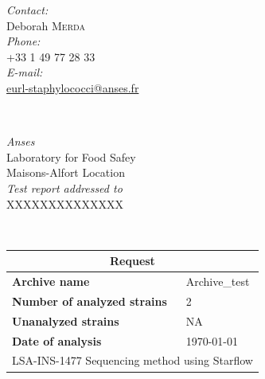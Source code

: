 \documentclass[a4paper]{article}
\begin{document}
\begin{titlepage}

\begin{minipage}{0.4\textwidth}
\begin{flushleft} \large
\emph{Contact:}\\
Deborah \textsc{Merda} \\ 
\emph{Phone:}\\
+33 1 49 77 28 33\\
\emph{E-mail:}\\
\href{mailto:eurl-staphylococci@anses.fr}{eurl-staphylococci@anses.fr}
\end{flushleft}
\end{minipage}
~
\begin{minipage}{0.5\textwidth}
\begin{flushright} \large
\emph{Anses} \\
Laboratory for Food Safey \\
Maisons-Alfort Location\\
[0.5cm] \emph{Test report addressed to } \\
XXXXXXXXXXXXXX\\ %
\end{flushright}
\end{minipage}\\[3cm]

{\renewcommand{\arraystretch}{2} %
{\setlength{\tabcolsep}{1.5cm} %
\begin{tabular}{|l|l|}
  \hline
  \multicolumn{2}{|c|}{\textbf{\Large{Request}}} \\
  \hline
  \textbf{\Large{Archive name}} & \Large{Archive\_test} \\%
  \textbf{\Large{Number of analyzed strains}} & \Large{2} \\%
  \textbf{\Large{Unanalyzed strains}} & \Large{NA} \\%
  \textbf{\Large{Date of analysis}} & \Large{\today} \\
  \hline
  \multicolumn{2}{|c|}{LSA-INS-1477 Sequencing method using Starflow} \\
  \hline
\end{tabular}\\[3cm]
}}


\end{titlepage}
\end{document}
